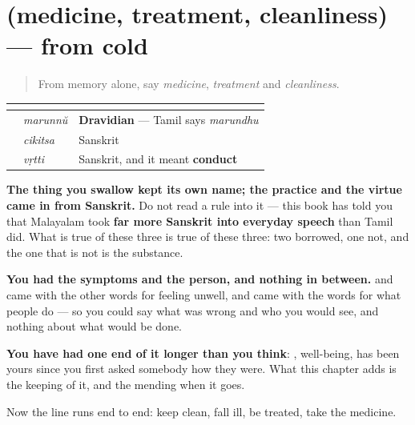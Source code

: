 \section[(medicine, treatment, cleanliness)]{(medicine, treatment, cleanliness) — from cold}

\label{lesson:ML-R107-medicine-recall}



\begin{quote}
From memory alone, say \emph{medicine}, \emph{treatment} and \emph{cleanliness}.
\end{quote}

\begin{grammarlens}[title={Grammar Lens: one native word among three}]
\noindent
\begin{tabularx}{\linewidth}{@{}>{\raggedright\arraybackslash}X>{\raggedright\arraybackslash}X>{\raggedright\arraybackslash}X@{}}
\toprule
\textbf{} & \textbf{} & \textbf{} \\
\midrule
\textbf{\ml{മരുന്ന്}} & \emph{marunnŭ} & \textbf{Dravidian} — Tamil says \emph{marundhu} \\
\textbf{\ml{ചികിത്സ}} & \emph{cikitsa} & Sanskrit \\
\textbf{\ml{വൃത്തി}} & \emph{vṛtti} & Sanskrit, and it meant \textbf{conduct} \\
\bottomrule
\end{tabularx}

\textbf{The thing you swallow kept its own name; the practice and the virtue came in from Sanskrit.} Do not read a rule into it — this book has told you that Malayalam took \textbf{far more Sanskrit into everyday speech} than Tamil did. What is true of these three is true of these three: two borrowed, one not, and the one that is not is the substance.
\end{grammarlens}

\begin{grammarlens}[title={What you've built}]
\textbf{You had the symptoms and the person, and nothing in between.} \textbf{} and \textbf{} came with the other words for feeling unwell, and \textbf{} came with the words for what people do — so you could say what was wrong and who you would see, and nothing about what would be done.

\textbf{You have had one end of it longer than you think}: \textbf{}, well-being, has been yours since you first asked somebody how they were. What this chapter adds is the keeping of it, and the mending when it goes.

Now the line runs end to end: keep clean, fall ill, be treated, take the medicine.
\end{grammarlens}

